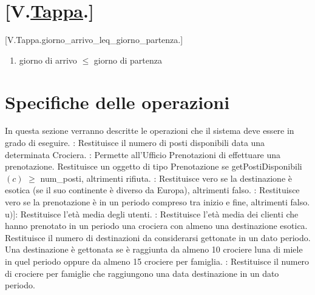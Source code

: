 \documentclass{article}
\begin{document}
\section*{[V.\hyperref[sec:Tappa]{Tappa}.]}
    [V.Tappa.giorno\_arrivo\_leq\_giorno\_partenza.]
    \begin{enumerate}
        \item giorno di arrivo $\leq$ giorno di partenza
    \end{enumerate}

\newpage
\section{Specifiche delle operazioni}

In questa sezione verranno descritte le operazioni che il sistema deve essere in grado di eseguire.
: Restituisce il numero di posti disponibili data una determinata Crociera.
: Permette all'Ufficio Prenotazioni di effettuare una prenotazione. Restituisce un oggetto di tipo Prenotazione se getPostiDisponibili$(c)$ $\geq$ num\_posti, altrimenti rifiuta.
: Restituisce vero se la destinazione è esotica (se il suo continente è diverso da Europa), altrimenti falso.
: Restituisce vero se la prenotazione è in un periodo compreso tra inizio e fine, altrimenti falso.
\newline
[getEtàMediaUtenti$($Utente[] u$)$]: Restituisce l'età media degli utenti.
: Restituisce l'età media dei clienti che hanno prenotato in un periodo una crociera con almeno una destinazione esotica.
 Restituisce il numero di destinazioni da considerarsi gettonate in un dato periodo. Una destinazione è gettonata se è raggiunta da almeno 10 crociere luna di miele in quel periodo oppure da almeno 15 crociere per famiglia.
: Restituisce il numero di crociere per famiglie che raggiungono una data destinazione in un dato periodo.
\end{document}
